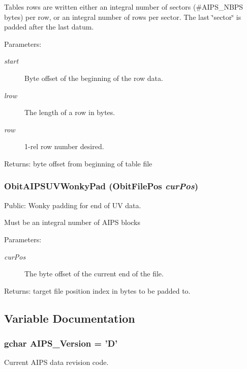 Tables rows are written either an integral number of sectors (\#AIPS\_\-NBPS bytes) per row, or an integral number of rows per sector. The last \char`\"{}sector\char`\"{} is padded after the last datum. \begin{Desc}
\item[Parameters:]
\begin{description}
\item[{\em start}]Byte offset of the beginning of the row data. \item[{\em lrow}]The length of a row in bytes. \item[{\em row}]1-rel row number desired. \end{description}
\end{Desc}
\begin{Desc}
\item[Returns:]byte offset from beginning of table file \end{Desc}
\subsubsection{ Obit\-AIPSUVWonky\-Pad ({\bf Obit\-File\-Pos} {\em cur\-Pos})}\label{ObitAIPS_8c_a15}


Public: Wonky padding for end of UV data. 

Must be an integral number of AIPS blocks \begin{Desc}
\item[Parameters:]
\begin{description}
\item[{\em cur\-Pos}]The byte offset of the current end of the file. \end{description}
\end{Desc}
\begin{Desc}
\item[Returns:]target file position index in bytes to be padded to. \end{Desc}


\subsection{Variable Documentation}
\subsubsection{\setlength{\rightskip}{0pt plus 5cm}gchar {\bf AIPS\_\-Version} = 'D'}\label{ObitAIPS_8c_a1}


Current AIPS data revision code. 

